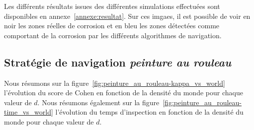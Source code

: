 \documentclass[francais,RandD]{rapportPFE}
\begin{document}

		Les différents résultats issues des différentes simulations effectuées sont disponibles en annexe~\ref{annexe:resultat}.
		Sur ces imgaes, il est possible de voir en noir les zones réelles de corrosion et en bleu les zones détectées comme comportant de la corrosion par les différents algorithmes de navigation.
		\subsection*{Stratégie de navigation \textit{peinture au rouleau}}
			Nous résumons sur la figure~\ref{fig:peinture_au_rouleau-kappa_vs_world} l'évolution du score de Cohen en fonction de la densité du monde pour chaque valeur de $d$.
			Nous résumons également sur la figure~\ref{fig:peinture_au_rouleau-time_vs_world} l'évolution du temps d'inspection en fonction de la densité du monde pour chaque valeur de $d$.
\end{document}
